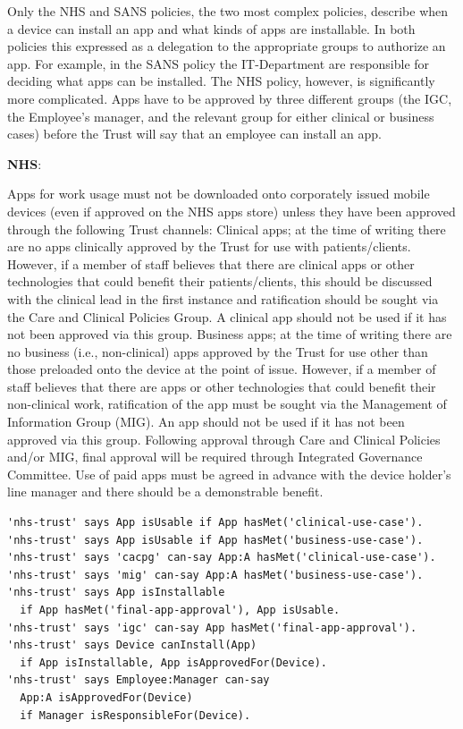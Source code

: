 \documentclass{llncs}
\newenvironment{policyrule}[1]{%
  \begin{mdframed}[]\footnotesize
      \noindent\textbf{\sffamily #1}:~\itshape%
}{%
  \end{mdframed}
}
\begin{document}
Only the NHS and SANS policies, the two most complex policies, describe when a device can install an app and what kinds of apps are installable.
In both policies this expressed as a delegation to the appropriate groups to authorize an app.
For example, in the SANS policy the IT-Department are responsible for deciding what apps can be installed.
The NHS policy, however, is significantly more complicated.
Apps have to be approved by three different groups (the IGC, the Employee's manager, and the relevant group for either clinical or business cases) before the Trust will say that an employee can install an app.
\begin{policyrule}{NHS}
  Apps for work usage must not be downloaded onto corporately issued
  mobile devices (even if approved on the NHS apps store) unless they have
  been approved through the following Trust channels:
% 
  Clinical apps; at the time of writing there are no apps clinically
  approved by the Trust for use with patients/clients. However, if a
  member of staff believes that there are clinical apps or other
  technologies that could benefit their patients/clients, this should be
  discussed with the clinical lead in the first instance and ratification
  should be sought via the Care and Clinical Policies Group. A clinical
  app should not be used if it has not been approved via this group.
% 
  Business apps; at the time of writing there are no business (i.e.,
  non-clinical) apps approved by the Trust for use other than those
  preloaded onto the device at the point of issue. However, if a member of
  staff believes that there are apps or other technologies that could
  benefit their non-clinical work, ratification of the app must be sought
  via the Management of Information Group (MIG). An app should not be used
  if it has not been approved via this group.
%
  Following approval through Care and Clinical Policies and/or MIG, final
  approval will be required through Integrated Governance Committee.
%
  Use of paid apps must be agreed in advance with the device holder's line
  manager and there should be a demonstrable benefit.
  \normalfont
  \begin{lstlisting}
'nhs-trust' says App isUsable if App hasMet('clinical-use-case').
'nhs-trust' says App isUsable if App hasMet('business-use-case').
'nhs-trust' says 'cacpg' can-say App:A hasMet('clinical-use-case').
'nhs-trust' says 'mig' can-say App:A hasMet('business-use-case').
'nhs-trust' says App isInstallable
  if App hasMet('final-app-approval'), App isUsable.
'nhs-trust' says 'igc' can-say App hasMet('final-app-approval').
'nhs-trust' says Device canInstall(App)
  if App isInstallable, App isApprovedFor(Device).
'nhs-trust' says Employee:Manager can-say
  App:A isApprovedFor(Device)
  if Manager isResponsibleFor(Device).
  \end{lstlisting}
\end{policyrule}
\end{document}
